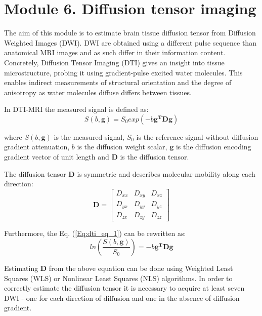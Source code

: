 \section{Module 6. Diffusion tensor imaging}

The aim of this module is to estimate brain tissue diffusion tensor
from Diffusion Weighted Images (DWI). DWI are obtained using a different
pulse sequence than anatomical MRI images and as such differ in their
information content. Concretely, Diffusion Tensor Imaging (DTI) gives
an insight into tissue microstructure, probing it using gradient-pulse
excited water molecules. This enables indirect measurements of structural
orientation and the degree of anisotropy as water molecules diffuse
differs between tissues.

In DTI-MRI the measured signal is defined as: 
\begin{equation}
S\left(b,\boldsymbol{g}\right)=S_{0}exp\left(-b\boldsymbol{g^{T}Dg}\right)\label{Eq:dti_eq_1}
\end{equation}

where $S\left(b,\boldsymbol{g}\right)$ is the measured signal, $S_{0}$
is the reference signal without diffusion gradient attenuation, $b$
is the diffusion weight scalar, $\boldsymbol{g}$ is the diffusion
encoding gradient vector of unit length and $\boldsymbol{D}$ is the
diffusion tensor.

The diffusion tensor $\boldsymbol{D}$ is symmetric and describes
molecular mobility along each direction: 
\begin{equation}
\boldsymbol{D}=\begin{bmatrix}D_{xx} & D_{xy} & D_{xz}\\
D_{yx} & D_{yy} & D_{yz}\\
D_{zx} & D_{zy} & D_{zz}
\end{bmatrix}\label{Eq:dti_eq_2}
\end{equation}

Furthermore, the Eq. (\ref{Eq:dti_eq_1}) can be rewritten as: 
\begin{equation}
ln\left(\dfrac{S\left(b,\boldsymbol{g}\right)}{S_{0}}\right)=-b\boldsymbol{g^{T}Dg}\label{Eq:dti_eq_3}
\end{equation}

Estimating $\boldsymbol{D}$ from the above equation can be done using
Weighted Least Squares (WLS) or Nonlinear Least Squares (NLS) algorithms.
In order to correctly estimate the diffusion tensor it is necessary
to acquire at least seven DWI - one for each direction of diffusion
and one in the absence of diffusion gradient.


